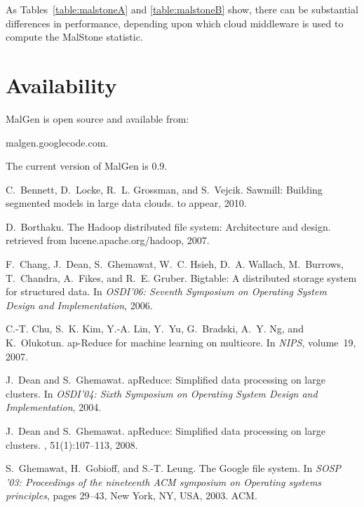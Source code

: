 \documentclass{acm_proc_article-sp}
\def\malstone{MalStone } \def\malgen{MalGen }
\begin{document}
As Tables~\ref{table:malstoneA} and \ref{table:malstoneB} show, there
can be substantial differences in performance, depending upon which
cloud middleware is used to compute the \malstone statistic.


\section{Availability}

\malgen is open source and available from:
\begin{center}
malgen.googlecode.com.
\end{center}
The current version of \malgen is 0.9.


\begin{thebibliography}{10}

C.~Bennett, D.~Locke, R.~L. Grossman, and S.~Vejcik.
\newblock Sawmill: Building segmented models in large data clouds.
\newblock to appear, 2010.

D.~Borthaku.
\newblock The {H}adoop distributed file system: Architecture and design.
\newblock retrieved from lucene.apache.org/hadoop, 2007.

F.~Chang, J.~Dean, S.~Ghemawat, W.~C. Hsieh, D.~A. Wallach, M.~Burrows,
  T.~Chandra, A.~Fikes, and R.~E. Gruber.
\newblock Bigtable: A distributed storage system for structured data.
\newblock In {\em OSDI'06: Seventh Symposium on Operating System Design and
  Implementation}, 2006.

C.-T. Chu, S.~K. Kim, Y.-A. Lin, Y.~Yu, G.~Bradski, A.~Y. Ng, and K.~Olukotun.
ap-{R}educe for machine learning on multicore.
\newblock In {\em NIPS}, volume~19, 2007.

J.~Dean and S.~Ghemawat.
ap{R}educe: Simplified data processing on large clusters.
\newblock In {\em OSDI'04: Sixth Symposium on Operating System Design and
  Implementation}, 2004.

J.~Dean and S.~Ghemawat.
ap{R}educe: Simplified data processing on large clusters.
, 51(1):107--113, 2008.


\vfill\eject


S.~Ghemawat, H.~Gobioff, and S.-T. Leung.
\newblock The {G}oogle file system.
\newblock In {\em SOSP '03: Proceedings of the nineteenth ACM symposium on
  Operating systems principles}, pages 29--43, New York, NY, USA, 2003. ACM.


\end{thebibliography}
\end{document}
